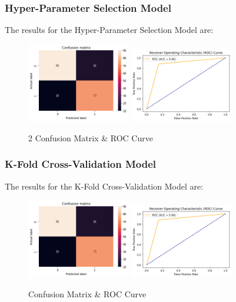 \documentclass[conference]{IEEEtran}
\begin{document}
\subsubsection{Hyper-Parameter Selection Model}

The results for the Hyper-Parameter Selection Model are:

\begin{figure}[h!]
    \includegraphics[width=4.5cm]{SVC/svc2_1.png}%
    \includegraphics[width=4.5cm]{SVC/svc2_2.png}%
    \caption{2 Confusion Matrix & ROC Curve}%
    \label{fig:conf_SVC_2}%
\end{figure}

\subsubsection{K-Fold Cross-Validation Model}

The results for the K-Fold Cross-Validation Model are:

\begin{figure}[h!]
    \includegraphics[width=4.5cm]{SVC/svc3_1.png}%
    \includegraphics[width=4.5cm]{SVC/svc3_2.png}%
    \caption{Confusion Matrix & ROC Curve}%
    \label{fig:conf_SVC_3}%
\end{figure}
\end{document}
